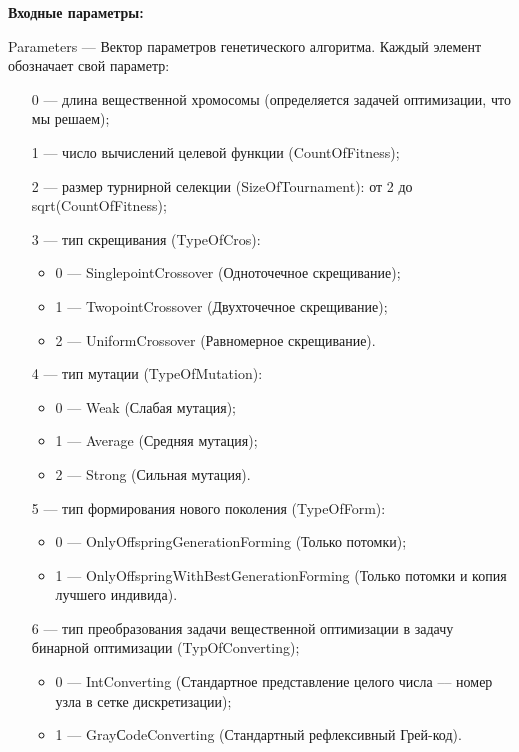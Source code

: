 \textbf{Входные параметры:}
 
Parameters --- Вектор параметров генетического алгоритма. Каждый элемент обозначает свой параметр:
 
 \begin{itemize}
 \item   [0] --- длина вещественной хромосомы (определяется задачей оптимизации, что мы решаем);
  \item   [1] --- число вычислений целевой функции (CountOfFitness);
   \item [2] --- размер турнирной селекции (SizeOfTournament): от 2 до sqrt(CountOfFitness);
 
 \item [3] --- тип скрещивания (TypeOfCros):
  \begin{itemize}
       \item 0 --- SinglepointCrossover (Одноточечное скрещивание);
 
       \item 1 --- TwopointCrossover (Двухточечное скрещивание);
 
       \item 2 --- UniformCrossover (Равномерное скрещивание).
	    \end{itemize}
 
 \item [4] --- тип мутации (TypeOfMutation):
  \begin{itemize}
       \item 0 --- Weak (Слабая мутация);
 
       \item 1 --- Average (Средняя мутация);
 
       \item 2 --- Strong (Сильная мутация).
	    \end{itemize}
 
 \item [5] --- тип формирования нового поколения (TypeOfForm):
  \begin{itemize}
       \item 0 --- OnlyOffspringGenerationForming (Только потомки);
 
       \item 1 --- OnlyOffspringWithBestGenerationForming (Только потомки и копия лучшего индивида).
	    \end{itemize}
 \item [6] --- тип преобразования задачи вещественной оптимизации в задачу бинарной оптимизации (TypOfConverting);
   \begin{itemize}
        \item 0 --- IntConverting (Стандартное представление целого числа –-- номер узла в сетке дискретизации);
        \item 1 --- GrayСodeConverting (Стандартный рефлексивный Грей-код).
			    \end{itemize}
 \end{itemize}
 
